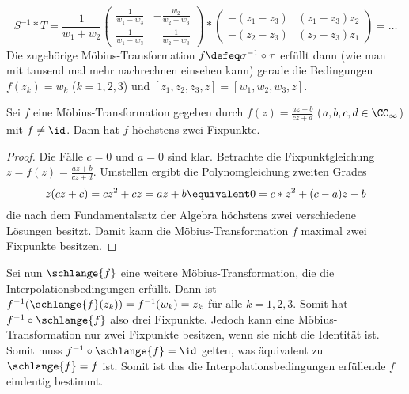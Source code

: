 \begin{exercisePage}
\begin{enumerate}[label=(zu \alph*), leftmargin=*]
		\begin{equation*}
			S^{-1} * T = \frac{1}{w_1 + w_2}
			\begin{pmatrix}
				\frac{1}{w_1 - w_3} & -\frac{w_2}{w_2 - w_3} \\
				\frac{1}{w_1 - w_3} & -\frac{1}{w_2 - w_3}
			\end{pmatrix}
			*
			 \begin{pmatrix}
			-(z_1 - z_3) & (z_1 - z_3) z_2 \\
			-(z_2 - z_3) & (z_2 - z_3) z_1
			\end{pmatrix}
			= \dots
		\end{equation*}
		Die zugehörige Möbius-Transformation $f \defeq \sigma^{-1} \circ \tau$ erfüllt dann (wie man mit tausend mal mehr nachrechnen einsehen kann) gerade die Bedingungen $f(z_k) = w_k$ ($k=1,2,3$) und $[z_1, z_2, z_3, z] = [w_1, w_2, w_3, z]$. 
		
		\begin{lemma}
			Sei $f$ eine Möbius-Transformation gegeben durch $f(z) = \frac{az + b}{cz + d}$ ($a,b,c,d \in \CC_\infty$) mit $f \neq \id$. Dann hat $f$ höchstens zwei Fixpunkte.
		\end{lemma}
		\begin{proof}
			Die Fälle $c = 0$ und $a = 0$ sind klar.
			Betrachte die Fixpunktgleichung $z = f(z) = \frac{az + b}{cz + d}$. Umstellen ergibt die Polynomgleichung zweiten Grades
			\begin{equation*}
				z ( cz + c) = c z^2 + cz = a z + b \equivalent 0 = c * z^2 + (c - a) z - b
			\end{equation*}
			die nach dem Fundamentalsatz der Algebra höchstens zwei verschiedene Lösungen besitzt. Damit kann die Möbius-Transformation $f$ maximal zwei Fixpunkte besitzen.
		\end{proof}
	
		Sei nun $\schlange{f}$ eine weitere Möbius-Transformation, die die Interpolationsbedingungen erfüllt. Dann ist $f^{-1}(\schlange{f}(z_k)) = f^{-1}(w_k) = z_k$ für alle $k = 1,2,3$. Somit hat $f^{-1} \circ \schlange{f}$ also drei Fixpunkte. Jedoch kann eine Möbius-Transformation nur zwei Fixpunkte besitzen, wenn sie nicht die Identität ist. Somit muss $f^{-1} \circ \schlange{f} = \id$ gelten, was äquivalent zu $\schlange{f} = f$ ist. Somit ist das die Interpolationsbedingungen erfüllende $f$ eindeutig bestimmt.
	\end{enumerate} 




	\pagebreak
	

\end{exercisePage}
